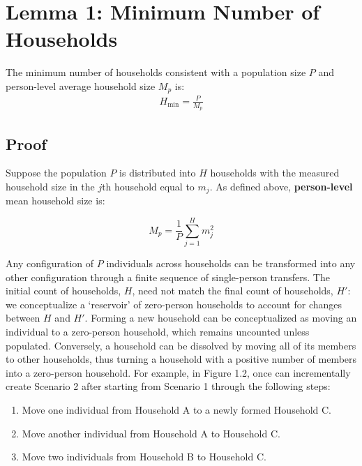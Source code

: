 \documentclass[
]{article}
\providecommand{\tightlist}{%
  \setlength{\itemsep}{0pt}\setlength{\parskip}{0pt}}
\begin{document}
\hypertarget{lemma-1-minimum-number-of-households}{%
\section{Lemma 1: Minimum Number of
Households}\label{lemma-1-minimum-number-of-households}}

The minimum number of households consistent with a population size \(P\)
and person-level average household size \(M_p\) is: \begin{align}
H_{\min} = \frac{P}{M_p}
\end{align}

\hypertarget{proof}{%
\subsection{Proof}\label{proof}}

Suppose the population \(P\) is distributed into \(H\) households with
the measured household size in the \(j\)th household equal to \(m_j\).
As defined above, \textbf{person-level} mean household size is:

\begin{equation}
M_p = \frac{1}{P}\sum_{j = 1}^H m_j^2
\end{equation}

Any configuration of \(P\) individuals across households can be
transformed into any other configuration through a finite sequence of
single-person transfers. The initial count of households, \(H\), need
not match the final count of households, \(H'\): we conceptualize a
`reservoir' of zero-person households to account for changes between
\(H\) and \(H'\). Forming a new household can be conceptualized as
moving an individual to a zero-person household, which remains uncounted
unless populated. Conversely, a household can be dissolved by moving all
of its members to other households, thus turning a household with a
positive number of members into a zero-person household. For example, in
Figure 1.2, once can incrementally create Scenario 2 after starting from
Scenario 1 through the following steps:

\begin{enumerate}
\def\labelenumi{\arabic{enumi}.}
\tightlist
\item
  Move one individual from Household A to a newly formed Household C.
\item
  Move another individual from Household A to Household C.
\item
  Move two individuals from Household B to Household C.
\end{enumerate}
\end{document}

